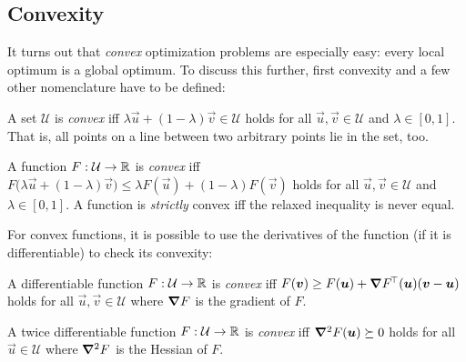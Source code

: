 		\subsection{Convexity}
			It turns out that \emph{convex} optimization problems are especially easy: every local optimum is a global optimum. To discuss this further, first convexity and a few other nomenclature have to be defined:
			\begin{definition}
				A set \(\mathcal{U}\) is \emph{convex} iff \( \lambda \vec{u} + (1 - \lambda) \vec{v} \in \mathcal{U} \) holds for all \(\vec{u}, \vec{v} \in \mathcal{U}\) and \( \lambda \in [0, 1] \). That is, all points on a line between two arbitrary points lie in the set, too.
			\end{definition}
			\begin{definition}
				A function \( F : \mathcal{U} \to \mathbb{R} \) is \emph{convex} iff \( F\bigl( \lambda \vec{u} + (1 - \lambda) \vec{v} \bigr) \leq \lambda F(\vec{u}) + (1 - \lambda) F(\vec{v}) \) holds for all \( \vec{u}, \vec{v} \in \mathcal{U} \) and \( \lambda \in [0, 1] \). A function is \emph{strictly} convex iff the relaxed inequality is never equal.
			\end{definition}

			For convex functions, it is possible to use the derivatives of the function (if it is differentiable) to check its convexity:
			\begin{theorem}
				A differentiable function \( F : \mathcal{U} \to \mathbb{R} \) is \emph{convex} iff \( F(\bm{v}) \geq F(\bm{u}) + \grad{F}^{\!\top}(\bm{u}) (\bm{v} - \bm{u}) \) holds for all \( \vec{u}, \vec{v} \in \mathcal{U} \) where \( \grad{F} \) is the gradient of \(F\).
			\end{theorem}
			\begin{theorem}
				A twice differentiable function \( F : \mathcal{U} \to \mathbb{R} \) is \emph{convex} iff \( \grad^2 F(\bm{u}) \succeq 0 \) holds for all \( \vec{u} \in \mathcal{U} \) where \( \grad^2 F \) is the Hessian of \(F\).
			\end{theorem}


